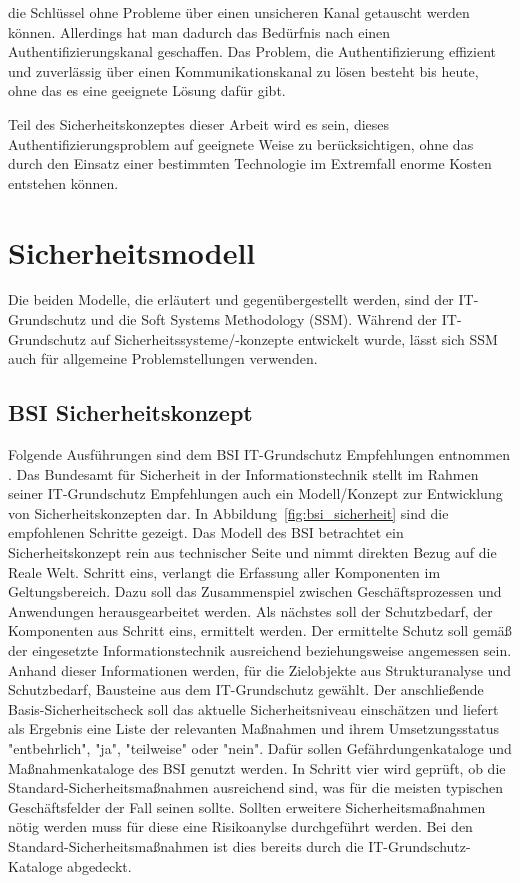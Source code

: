 \documentclass[11pt,a4paper]{report}
\begin{document}
die Schlüssel ohne Probleme über einen unsicheren Kanal getauscht werden können. Allerdings hat man dadurch das Bedürfnis nach einen Authentifizierungskanal geschaffen. Das Problem, die Authentifizierung effizient und zuverlässig über einen Kommunikationskanal zu lösen besteht bis heute, ohne das es eine geeignete Lösung dafür gibt. 

Teil des Sicherheitskonzeptes dieser Arbeit wird es sein, dieses Authentifizierungsproblem auf geeignete Weise zu berücksichtigen, ohne das durch den Einsatz einer bestimmten Technologie im Extremfall enorme Kosten entstehen können. 

\section{Sicherheitsmodell}

Die beiden Modelle, die erläutert und gegenübergestellt werden, sind der IT-Grund\-schutz und die Soft Systems Methodology (SSM). Während der IT-Grundschutz auf Sicherheits\-systeme/-konzepte entwickelt wurde, lässt sich SSM auch für allgemeine Problemstellungen verwenden.

\subsection{BSI Sicherheitskonzept}

Folgende Ausführungen sind dem BSI IT-Grundschutz Empfehlungen entnommen \cite{bsi_standard1,bsi_standard2,bsi_standard3,bsi_standard4}.
Das Bundesamt für Sicherheit in der Informationstechnik stellt im Rahmen seiner IT-Grundschutz Empfehlungen auch ein Modell/Konzept zur Entwicklung von Sicherheitskonzepten dar. In Abbildung~\ref{fig:bsi_sicherheit} sind die empfohlenen Schritte gezeigt. Das Modell des BSI betrachtet ein Sicherheitskonzept rein aus technischer Seite und nimmt direkten Bezug auf die Reale Welt. Schritt eins, verlangt die Erfassung aller Komponenten im Geltungsbereich. Dazu soll das Zusammenspiel zwischen Geschäftsprozessen und Anwendungen herausgearbeitet werden. Als nächstes soll der Schutzbedarf, der Komponenten aus Schritt eins, ermittelt werden. Der ermittelte Schutz soll gemäß der eingesetzte Informationstechnik ausreichend beziehungsweise angemessen sein. Anhand dieser Informationen werden, für die Zielobjekte aus Strukturanalyse und Schutzbedarf, Bausteine aus dem IT-Grundschutz gewählt. Der anschließende Basis-Sicherheitscheck soll das aktuelle Sicherheitsniveau einschätzen und liefert als Ergebnis eine Liste der relevanten Maßnahmen und ihrem Umsetzungsstatus "entbehrlich", "ja", "teilweise" oder "nein". Dafür sollen Gefährdungenkataloge und Maßnahmenkataloge des BSI genutzt werden. In Schritt vier wird geprüft, ob die Standard-Sicherheitsmaßnahmen ausreichend sind, was für die meisten typischen Geschäftsfelder der Fall seinen sollte. Sollten erweitere Sicherheitsmaßnahmen nötig werden muss für diese eine Risikoanylse durchgeführt werden. Bei den Standard-Sicherheitsmaßnahmen ist dies bereits durch die IT-Grundschutz-Kataloge abgedeckt. 
\end{document}
